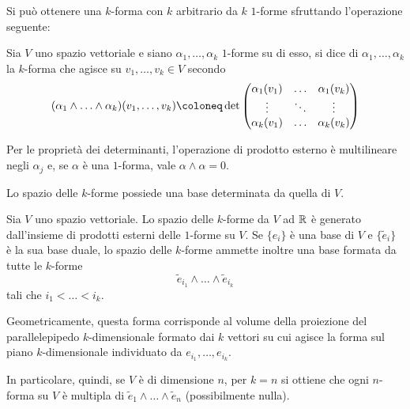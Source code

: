 Si può ottenere una $k$-forma con $k$ arbitrario da $k$ $1$-forme sfruttando l'operazione seguente:
\begin{definition}
  Sia $V$ uno spazio vettoriale e siano $\alpha_1, \ldots, \alpha_k$ $1$-forme su di esso, si dice  di $\alpha_1, \ldots, \alpha_k$ la $k$-forma che agisce su $v_1, \ldots, v_k \in V$ secondo \begin{equation}
  (\alpha_1 \wedge \ldots \wedge \alpha_k) (v_1, \ldots, v_k) \defeq \det \pmqty{\alpha_1 (v_1) & \ldots & \alpha_1 (v_k) \\
          \vdots & \ddots & \vdots \\
          \alpha_k (v_1) & \ldots & \alpha_k (v_k)}
  \end{equation} 
\end{definition}
\begin{remark}
  Per le proprietà dei determinanti, l'operazione di prodotto esterno è multilineare negli $\alpha_j$ e, se $\alpha$ è una $1$-forma, vale $\alpha \wedge \alpha = 0$.
\end{remark}

Lo spazio delle $k$-forme possiede una base determinata da quella di $V$.
\begin{theorem} \label{thm:kformBase}
  Sia $V$ uno spazio vettoriale. Lo spazio delle $k$-forme da $V$ ad $\mathbb{R}$ è generato dall'insieme di prodotti esterni delle $1$-forme su $V$. Se $\{e_i\} $ è una base di $V$ e $\{\tilde{e}_i\} $ è la sua base duale, lo spazio delle $k$-forme ammette inoltre una base formata da tutte le $k$-forme \begin{equation}
    \tilde{e}_{i_1} \wedge \ldots \wedge \tilde{e}_{i_k}
  \end{equation}
  tali che $i_1 < \ldots < i_k$.
\end{theorem}
\begin{remark}
  Geometricamente, questa forma corrisponde al volume della proiezione del parallelepipedo $k$-dimensionale formato dai $k$ vettori su cui agisce la forma sul piano $k$-dimensionale individuato da $e_{i_1},\ldots,e_{i_k}$.
\end{remark}
\begin{remark} \label{rem:volumeForm}
  In particolare, quindi, se $V$ è di dimensione $n$, per $k=n$ si ottiene che ogni $n$-forma su $V$ è multipla di $\tilde{e}_1 \wedge \ldots \wedge \tilde{e}_n$ (possibilmente nulla).
\end{remark}

